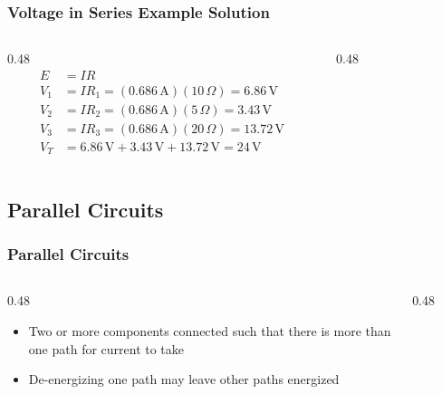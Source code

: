 \begin{frame}
    \frametitle{Voltage in Series Example Solution}
    \begin{columns}
        \begin{column}{0.48\linewidth}
            \[
                \begin{aligned}
                    E&=IR\\
                    V_1&=IR_1=\left(0.686\,\text{A}\right)\left(10\,\Omega\right)=6.86\,\text{V}\\
                    V_2&=IR_2=\left(0.686\,\text{A}\right)\left(5\,\Omega\right)=3.43\,\text{V}\\
                    V_3&=IR_3=\left(0.686\,\text{A}\right)\left(20\,\Omega\right)=13.72\,\text{V}\\
                    V_T&=6.86\,\text{V}+3.43\,\text{V}+13.72\,\text{V}=24\,\text{V}
                \end{aligned}
            \]
        \end{column}
        \begin{column}{0.48\linewidth}
            \begin{figure}
                \centering
                \resizebox{\columnwidth}{!}{
                    
                }
            \end{figure}
        \end{column}
	\end{columns}
\end{frame}

\subsection{Parallel Circuits}

\begin{frame}
    \frametitle{Parallel Circuits}

	\begin{columns}
        \begin{column}{0.48\linewidth}
            \begin{itemize}[<+- | alert@+>]
                \item{Two or more components connected such that there is more than one path for current to take}
                \item{De-energizing one path may leave other paths energized}
            \end{itemize}
        \end{column}
        \begin{column}{0.48\linewidth}
            \begin{figure}
                \centering
                \resizebox{\columnwidth}{!}{
                    
                }
            \end{figure}
        \end{column}
	\end{columns}
\end{frame}

